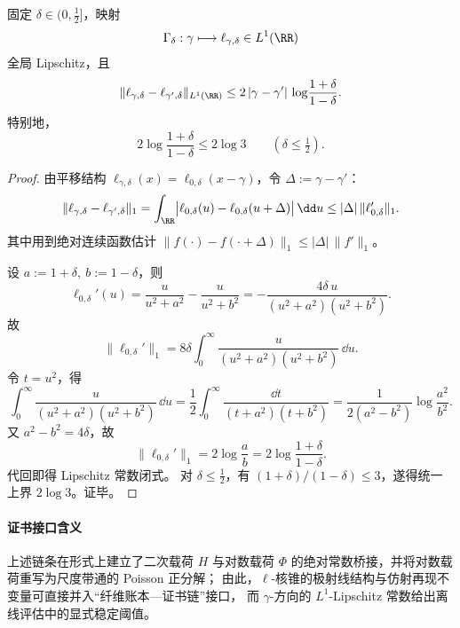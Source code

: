 \begin{theorem}\label{thm:xi-logdefect-gamma-translation-l1-lipschitz}
固定 \(\delta\in(0,\tfrac12]\)，映射
\[
\Gamma_\delta:\gamma\longmapsto \ell_{\gamma,\delta}\in L^1(\RR)
\]
全局 Lipschitz，且
\[
\|\ell_{\gamma,\delta}-\ell_{\gamma',\delta}\|_{L^1(\RR)}
\le
2\,|\gamma-\gamma'|\,\log\!\frac{1+\delta}{1-\delta}.
\]
特别地，
\[
2\log\!\frac{1+\delta}{1-\delta}\le 2\log 3
\qquad(\delta\le\tfrac12).
\]
\end{theorem}
\begin{proof}
由平移结构 \(\ell_{\gamma,\delta}(x)=\ell_{0,\delta}(x-\gamma)\)，令 \(\Delta:=\gamma-\gamma'\)：
\[
\|\ell_{\gamma,\delta}-\ell_{\gamma',\delta}\|_1
=
\int_{\RR}\bigl|\ell_{0,\delta}(u)-\ell_{0,\delta}(u+\Delta)\bigr|\,\dd u
\le
|\Delta|\,\|\ell_{0,\delta}'\|_1.
\]
其中用到绝对连续函数估计
\(
\|f(\cdot)-f(\cdot+\Delta)\|_1\le |\Delta|\,\|f'\|_1
\)。

设 \(a:=1+\delta,\ b:=1-\delta\)，则
\[
\ell_{0,\delta}'(u)
=
\frac{u}{u^2+a^2}-\frac{u}{u^2+b^2}
=
-\frac{4\delta\,u}{(u^2+a^2)(u^2+b^2)}.
\]
故
\[
\|\ell_{0,\delta}'\|_1
=
8\delta\int_0^\infty \frac{u}{(u^2+a^2)(u^2+b^2)}\,\dd u.
\]
令 \(t=u^2\)，得
\[
\int_0^\infty \frac{u}{(u^2+a^2)(u^2+b^2)}\,\dd u
=
\frac12\int_0^\infty\frac{\dd t}{(t+a^2)(t+b^2)}
=
\frac{1}{2(a^2-b^2)}\log\frac{a^2}{b^2}.
\]
又 \(a^2-b^2=4\delta\)，故
\[
\|\ell_{0,\delta}'\|_1
=
2\log\frac{a}{b}
=
2\log\frac{1+\delta}{1-\delta}.
\]
代回即得 Lipschitz 常数闭式。
对 \(\delta\le\tfrac12\)，有 \((1+\delta)/(1-\delta)\le 3\)，遂得统一上界 \(2\log3\)。证毕。
\end{proof}

\paragraph{证书接口含义}
上述链条在形式上建立了二次载荷 \(H\) 与对数载荷 \(\Phi\) 的绝对常数桥接，并将对数载荷重写为尺度带通的 Poisson 正分解；
由此，\(\ell\)-核锥的极射线结构与仿射再现不变量可直接并入“纤维账本—证书链”接口，
而 \(\gamma\)-方向的 \(L^1\)-Lipschitz 常数给出离线评估中的显式稳定阈值。

\endinput
